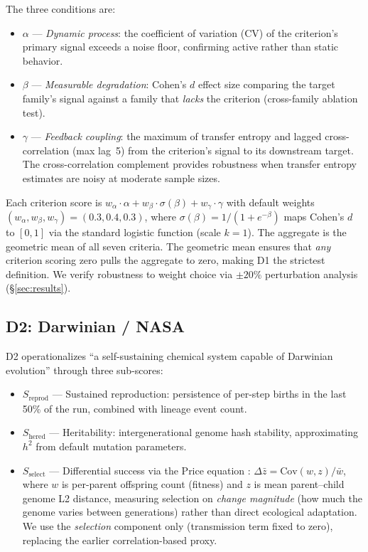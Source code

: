 \documentclass[letterpaper]{article}
\begin{document}
The three conditions are:
\begin{itemize}
\item $\alpha$ --- \emph{Dynamic process}: the coefficient of variation (CV)
  of the criterion's primary signal exceeds a noise floor, confirming
  active rather than static behavior.
\item $\beta$ --- \emph{Measurable degradation}: Cohen's $d$ effect size
  comparing the target family's signal against a family that \emph{lacks}
  the criterion (cross-family ablation test).
\item $\gamma$ --- \emph{Feedback coupling}: the maximum of transfer entropy
  \citep{schreiber_2000_measuring} and lagged cross-correlation (max lag~5)
  from the criterion's signal to its downstream target.
  The cross-correlation complement provides robustness when transfer entropy
  estimates are noisy at moderate sample sizes.
\end{itemize}

Each criterion score is $w_\alpha \cdot \alpha + w_\beta \cdot
\sigma(\beta) + w_\gamma \cdot \gamma$ with default weights
$(w_\alpha, w_\beta, w_\gamma) = (0.3, 0.4, 0.3)$, where
$\sigma(\beta) = 1/(1 + e^{-\beta})$ maps Cohen's $d$ to $[0,1]$
via the standard logistic function (scale $k=1$).
The aggregate is the geometric mean of all seven criteria.
The geometric mean ensures that \emph{any} criterion
scoring zero pulls the aggregate to zero, making D1 the strictest
definition.  We verify robustness to weight choice via $\pm 20\%$
perturbation analysis (\S\ref{sec:results}).

\subsection{D2: Darwinian / NASA}

D2 operationalizes ``a self-sustaining chemical system capable of Darwinian
evolution'' \citep{joyce_1994_foreword} through three sub-scores:

\begin{itemize}
\item $S_\text{reprod}$ --- Sustained reproduction: persistence of per-step
  births in the last 50\% of the run, combined with lineage event count.
\item $S_\text{hered}$ --- Heritability: intergenerational genome hash
  stability, approximating $h^2$ from default mutation parameters.
\item $S_\text{select}$ --- Differential success via the Price equation
  \citep{price_1970_selection}: $\Delta\bar{z} = \text{Cov}(w,z)/\bar{w}$,
  where $w$ is per-parent offspring count (fitness) and $z$ is mean
  parent--child genome L2 distance, measuring selection on \emph{change
  magnitude} (how much the genome varies between generations) rather than
  direct ecological adaptation.  We use the \emph{selection} component only
  (transmission term fixed to zero), replacing the earlier
  correlation-based proxy.
\end{itemize}
\end{document}
